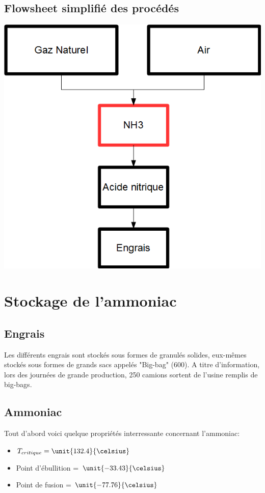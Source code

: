 \subsection*{Flowsheet simplifié des procédés}
\begin{center}
\includegraphics[scale=0.6]{FlYara.png}
\end{center}

\newpage
\section*{Stockage de l'ammoniac}
\subsection*{Engrais}
Les différents engrais sont stockés sous formes de granulés solides, eux-mêmes stockés sous formes de grands sacs appelés "Big-bag" (\unit{600}{\kilogram}). A titre d'information, lors des journées de grande production, 250 camions sortent de l'usine remplis de big-bags. 
\subsection*{Ammoniac}
Tout d'abord voici quelque propriétés interressante concernant l'ammoniac:

\begin{itemize}
\item{$T_{critique} = \unit{132.4}{\celsius}$}

\item{Point d'ébullition = $\unit{-33.43}{\celsius}$}

\item{Point de fusion = $\unit{-77.76}{\celsius}$}
\end{itemize}

